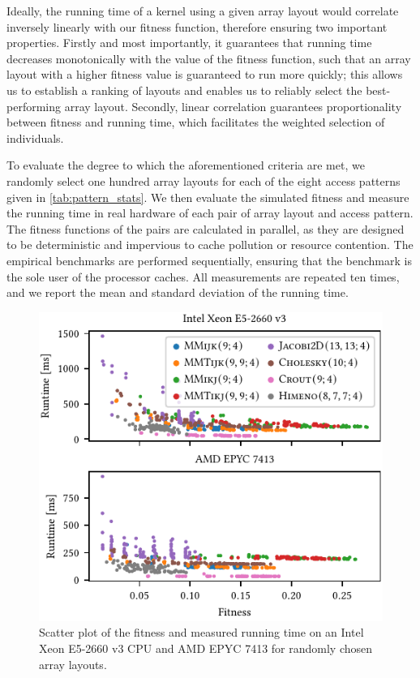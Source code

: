 Ideally, the running time of a kernel using a given array layout would correlate inversely linearly with our fitness function, therefore ensuring two important properties. 
Firstly and most importantly, it guarantees that running time decreases monotonically with the value of the fitness function, such that an array layout with a higher fitness value is guaranteed to run more quickly; this allows us to establish a ranking of layouts and enables us to reliably select the best-performing array layout. 
Secondly, linear correlation guarantees proportionality between fitness and running time, which facilitates the weighted selection of individuals.

To evaluate the degree to which the aforementioned criteria are met, we randomly select one hundred array layouts for each of the eight access patterns given in \cref{tab:pattern_stats}. We then evaluate the simulated fitness and measure the running time in real hardware of each pair of array layout and access pattern. The fitness functions of the pairs are calculated in parallel, as they are designed to be deterministic and impervious to cache pollution or resource contention. The empirical benchmarks are performed sequentially, ensuring that the benchmark is the sole user of the processor caches. All measurements are repeated ten times, and we report the mean and standard deviation of the running time.

\begin{figure}
    \centering
    \includegraphics{figures/fitness_vs_runtime.pdf}
    \caption{Scatter plot of the fitness and measured running time on an Intel Xeon E5-2660 v3 CPU and AMD EPYC 7413 for randomly chosen array layouts.}
    \label{fig:fitness_corr}
\end{figure}

